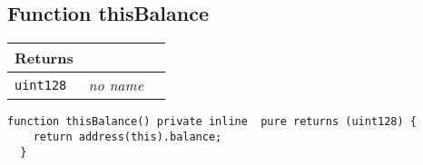 \subsection{Function thisBalance}


\ifsoltables
\noindent\begin{tabular}{|l|l|p{5cm}|}\hline
\multicolumn{3}{|l|}{\bf Returns}\\\hline
\tt uint128 & {\em no name} &\\\hline
\end{tabular}
\fi

\vspace{2cm}

\begin{lstlisting}[firstnumber=346]
  function thisBalance() private inline  pure returns (uint128) {
    return address(this).balance;
  }
\end{lstlisting}
